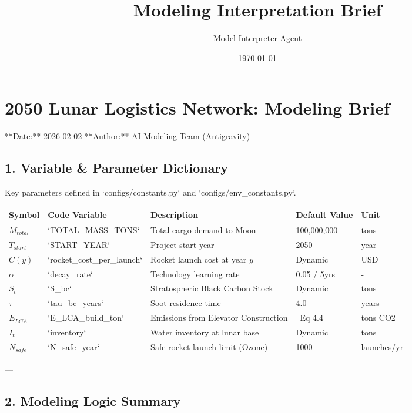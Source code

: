 \documentclass{article}
\title{Modeling Interpretation Brief}
\author{Model Interpreter Agent}
\date{\today}
\begin{document}
\maketitle
\section*{2050 Lunar Logistics Network: Modeling Brief}
\par
**Date:** 2026-02-02
**Author:** AI Modeling Team (Antigravity)
\par
\subsection*{1. Variable & Parameter Dictionary}
Key parameters defined in `configs/constants.py` and `configs/env\_constants.py`.
\par
\begin{center}
\begin{longtable}{lllll}
\toprule
Symbol & Code Variable & Description & Default Value & Unit \\
\midrule
$M_{total}$ & `TOTAL\_MASS\_TONS` & Total cargo demand to Moon & 100,000,000 & tons \\
$T_{start}$ & `START\_YEAR` & Project start year & 2050 & year \\
$C(y)$ & `rocket\_cost\_per\_launch` & Rocket launch cost at year $y$ & Dynamic & USD \\
$\alpha$ & `decay\_rate` & Technology learning rate & 0.05 / 5yrs & - \\
$S_t$ & `S\_bc` & Stratospheric Black Carbon Stock & Dynamic & tons \\
$\tau$ & `tau\_bc\_years` & Soot residence time & 4.0 & years \\
$E_{LCA}$ & `E\_LCA\_build\_ton` & Emissions from Elevator Construction & ~Eq 4.4 & tons CO2 \\
$I_t$ & `inventory` & Water inventory at lunar base & Dynamic & tons \\
$N_{safe}$ & `N\_safe\_year` & Safe rocket launch limit (Ozone) & 1000 & launches/yr \\
\bottomrule
\end{longtable}
\end{center}
\par
---
\par
\subsection*{2. Modeling Logic Summary}
\par
\end{document}
